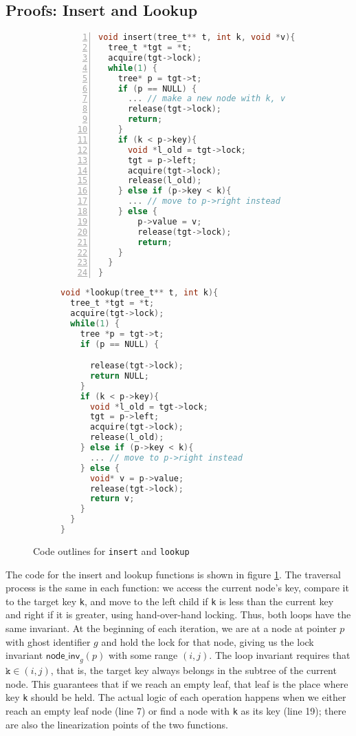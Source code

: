 \documentclass[runningheads]{llncs}
\begin{document}
\subsection{Proofs: Insert and Lookup}

\begin{figure}[ht]
\begin{subfigure}[t]{0.52\textwidth}
\begin{lstlisting}[language = C, basicstyle=\small\ttfamily, numbers=left]
void insert(tree_t** t, int k, void *v){
  tree_t *tgt = *t;
  acquire(tgt->lock);
  while(1) {
    tree* p = tgt->t;
    if (p == NULL) {
      ... // make a new node with k, v
      release(tgt->lock);
      return;
    }
    if (k < p->key){
      void *l_old = tgt->lock;
      tgt = p->left;
      acquire(tgt->lock);
      release(l_old);
    } else if (p->key < k){
      ... // move to p->right instead
    } else {
    	p->value = v;
        release(tgt->lock);
    	return;
    }
  }
} 
\end{lstlisting} 
\end{subfigure}\qquad
\begin{subfigure}[t]{0.4\textwidth}
 \begin{lstlisting}[language = C, basicstyle=\small\ttfamily]
void *lookup(tree_t** t, int k){
  tree_t *tgt = *t;
  acquire(tgt->lock);
  while(1) {
    tree *p = tgt->t;
    if (p == NULL) {

      release(tgt->lock);
      return NULL;
    }
    if (k < p->key){
      void *l_old = tgt->lock;
      tgt = p->left;
      acquire(tgt->lock);
      release(l_old);
    } else if (p->key < k){
      ... // move to p->right instead
    } else {
      void* v = p->value;
      release(tgt->lock);
      return v;
    }
  }
}
\end{lstlisting}
\end{subfigure}
\caption{Code outlines for \lstinline{insert} and \lstinline{lookup}}
\label{bst-conc}
\end{figure}

The code for the insert and lookup functions is shown in figure \ref{bst-conc}. The traversal process is the same in each function: we access the current node's key, compare it to the target key \lstinline{k}, and move to the left child if \lstinline{k} is less than the current key and right if it is greater, using hand-over-hand locking. Thus, both loops have the same invariant. At the beginning of each iteration, we are at a node at pointer $p$ with ghost identifier $g$ and hold the lock for that node, giving us the lock invariant $\mathsf{node\_inv}_g(p)$ with some range $(i, j)$. The loop invariant requires that $\texttt{k} \in (i, j)$, that is, the target key always belongs in the subtree of the current node. This guarantees that if we reach an empty leaf, that leaf is the place where key \lstinline{k} should be held. The actual logic of each operation happens when we either reach an empty leaf node (line 7) or find a node with \lstinline{k} as its key (line 19); there are also the linearization points of the two functions.
\end{document}
